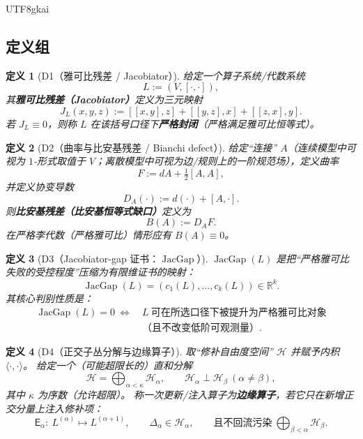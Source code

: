 \documentclass[12pt]{article}
\newtheorem{definition}{定义}[section]
\newcommand{\RR}{\mathbb{R}}
\newcommand{\JacGap}{\operatorname{JacGap}}
\begin{document}
\begin{CJK*}{UTF8}{gkai}
\subsection{定义组}
\label{subsec:tex27-ch24-defs}

\begin{definition}[D1（雅可比残差 / Jacobiator）]
\label{def:tex27-ch24-d1}
给定一个算子系统/代数系统
\[
  L:=(V,[\cdot,\cdot]),
\]
其\textbf{雅可比残差（Jacobiator）}定义为三元映射
\[
  J_L(x,y,z):=[[x,y],z]+[[y,z],x]+[[z,x],y].
\]
若 $J_L\equiv 0$，则称 $L$ 在该括号口径下\textbf{严格封闭}（严格满足雅可比恒等式）。
\end{definition}

\begin{definition}[D2（曲率与比安基残差 / Bianchi defect）]
\label{def:tex27-ch24-d2}
给定“连接” $A$（连续模型中可视为 $1$-形式取值于 $V$；离散模型中可视为边/规则上的一阶规范场），定义曲率
\[
  F:=dA+\tfrac12[A,A],
\]
并定义协变导数
\[
  D_A(\cdot):=d(\cdot)+[A,\cdot].
\]
则\textbf{比安基残差（比安基恒等式缺口）}定义为
\[
  B(A):=D_A F.
\]
在严格李代数（严格雅可比）情形应有 $B(A)\equiv 0$。
\end{definition}

\begin{definition}[D3（Jacobiator-gap 证书：$\JacGap$）]
\label{def:tex27-ch24-d3}
$\JacGap(L)$ 是把“严格雅可比失败的受控程度”压缩为有限维证书的映射：
\[
  \JacGap(L)=(c_1(L),\dots,c_k(L))\in\RR^k.
\]
其核心判别性质是：
\[
  \begin{aligned}
    \JacGap(L)=0
    \ \Longleftrightarrow\ &
    L\ \text{可在所选口径下被提升为严格雅可比对象}\\
    &\text{（且不改变低阶可观测量）}.
  \end{aligned}
\]
\end{definition}

\begin{definition}[D4（正交子丛分解与边缘算子）]
\label{def:tex27-ch24-d4}
取“修补自由度空间” $\mathcal{H}$ 并赋予内积 $\langle\cdot,\cdot\rangle$。
给定一个（可能超限长的）直和分解
\[
  \mathcal{H}=\bigoplus_{\alpha<\kappa}\mathcal{H}_\alpha,
  \qquad
  \mathcal{H}_\alpha\perp \mathcal{H}_\beta\ (\alpha\neq\beta),
\]
其中 $\kappa$ 为序数（允许超限）。
称一次更新/注入算子为\textbf{边缘算子}，若它只在新增正交分量上注入修补项：
\[
  \mathsf{E}_\alpha:\ L^{(\alpha)}\mapsto L^{(\alpha+1)},
  \qquad
  \Delta_\alpha\in\mathcal{H}_\alpha,
  \qquad
  \text{且不回流污染}\ \bigoplus_{\beta<\alpha}\mathcal{H}_\beta.
\]
\end{definition}


\end{CJK*}
\end{document}
